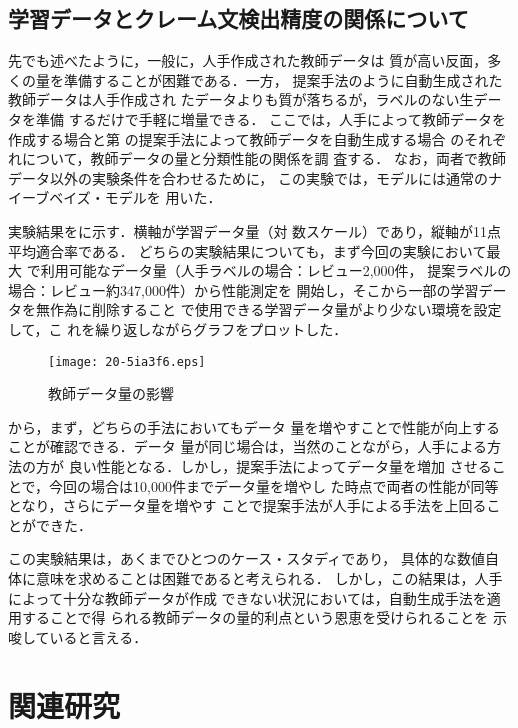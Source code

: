 \documentclass[japanese]{jnlp_1.4}
\def\sec#1{}
\def\fig#1{}
\begin{document}
\subsection{学習データとクレーム文検出精度の関係について}
\label{sec:exp_size}

先でも述べたように，一般に，人手作成された教師データは
質が高い反面，多くの量を準備することが困難である．一方，
提案手法のように自動生成された教師データは人手作成され
たデータよりも質が落ちるが，ラベルのない生データを準備
するだけで手軽に増量できる．
ここでは，人手によって教師データを作成する場合と第
\sec{gen}の提案手法によって教師データを自動生成する場合
のそれぞれについて，教師データの量と分類性能の関係を調
査する．
なお，両者で教師データ以外の実験条件を合わせるために，
この実験では，モデルには通常のナイーブベイズ・モデルを
用いた．


実験結果を\fig{datasize}に示す．横軸が学習データ量（対
  数スケール）であり，縦軸が11点平均適合率である．
どちらの実験結果についても，まず今回の実験において最大
で利用可能なデータ量（人手ラベルの場合：レビュー2,000件，
  提案ラベルの場合：レビュー約347,000件）から性能測定を
開始し，そこから一部の学習データを無作為に削除すること
で使用できる学習データ量がより少ない環境を設定して，こ
れを繰り返しながらグラフをプロットした．

\begin{figure}[t]
 \begin{center}
 \texttt{[image: 20-5ia3f6.eps]}
 \end{center}
 \caption{教師データ量の影響}
 \label{fig:datasize}
\end{figure}

\fig{datasize}から，まず，どちらの手法においてもデータ
量を増やすことで性能が向上することが確認できる．データ
量が同じ場合は，当然のことながら，人手による方法の方が
良い性能となる．しかし，提案手法によってデータ量を増加
させることで，今回の場合は10,000件までデータ量を増やし
た時点で両者の性能が同等となり，さらにデータ量を増やす
ことで提案手法が人手による手法を上回ることができた．

この実験結果は，あくまでひとつのケース・スタディであり，
具体的な数値自体に意味を求めることは困難であると考えられる．
しかし，この結果は，人手によって十分な教師データが作成
できない状況においては，自動生成手法を適用することで得
られる教師データの量的利点という恩恵を受けられることを
示唆していると言える．


\section{関連研究}
\label{sec:related}
\end{document}
